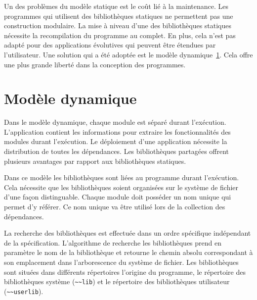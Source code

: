 

Un des problèmes du modèle statique est le coût lié à la maintenance.  Les
programmes qui utilisent des bibliothèques statiques ne permettent pas une
construction modulaire. La mise à niveau d'une des bibliothèques statiques
nécessite la recompilation du programme au complet. En plus, cela n'est pas
adapté pour des applications évolutives qui peuvent être étendues
par l'utilisateur. Une solution qui a été adoptée est le
modèle dynamique~\ref{sec:ch4_model_dynamic}. Cela offre une plus grande
liberté dans la conception des programmes.


\section{Modèle dynamique}
\label{sec:ch4_model_dynamic}

Dans le modèle dynamique, chaque module est séparé durant l'exécution.
L'application contient les informations pour extraire les fonctionnalités des
modules durant l'exécution. Le déploiement d'une application nécessite la
distribution de toutes les dépendances.  Les bibliothèques partagées offrent
plusieurs avantages par rapport aux bibliothèques statiques.

Dans ce modèle les bibliothèques sont liées au programme durant l'exécution. Cela
nécessite que les bibliothèques soient organisées sur le système de fichier d'une façon
distinguable. Chaque module doit posséder un nom unique qui permet d'y référer.
Ce nom unique va être utilisé lors de la collection des dépendances.




La recherche des bibliothèques est effectuée dans un ordre spécifique
indépendant de la spécification.  L'algorithme de recherche les bibliothèques
prend en paramètre le nom de la bibliothèque et retourne le chemin absolu
correspondant à son emplacement dans l'arborescence du système de fichier. Les
bibliothèques sont situées dans différents répertoires l'origine du programme,
le répertoire des bibliothèques système (\lstinline{~~lib}) et le
répertoire des bibliothèques utilisateur (\lstinline{~~userlib}).

